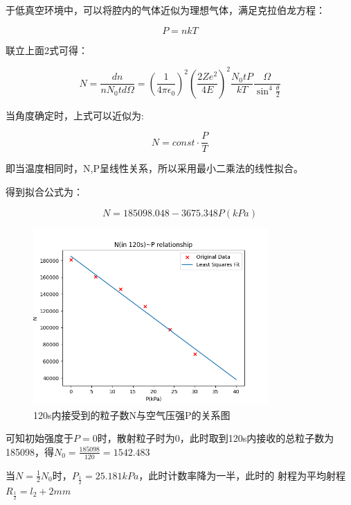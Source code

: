 \documentclass[a4paper,UTF8]{ctexart}
\begin{document}
于低真空环境中，可以将腔内的气体近似为理想气体，满足克拉伯龙方程：

\begin{equation}
    P = nkT
\end{equation}

联立上面2式可得：

\begin{equation}
    N = \frac{dn}{nN_{0}td\Omega} = (\frac{1}{4\pi \epsilon_{0}})^2 (\frac{2Ze^2}{4E})^2 \frac{N_0 t P}{k T} \frac{\Omega}{\sin^4{\frac{\theta}{2}}}
\end{equation}

当角度确定时，上式可以近似为:

\begin{equation}
    N = const \cdot \frac{P}{T}
\end{equation}

即当温度相同时，N,P呈线性关系，所以采用最小二乘法的线性拟合。

得到拟合公式为：

\begin{equation}
    N = 185098.048 -3675.348 P(kPa)
\end{equation}

\begin{figure}[H]
    \centering
    \begin{minipage}[b]{0.9\textwidth}
        \centering
        \includegraphics[width=0.8\textwidth]{./np.png}
        \caption{120s内接受到的粒子数N与空气压强P的关系图}
    \end{minipage}
\end{figure}

可知初始强度于$P=0$时，散射粒子时为0，此时取到120s内接收的总粒子数为185098，得$N_0 = \frac{185098}{120} = 1542.483$

当$N = \frac{1}{2}N_0$时，$P_{\frac{1}{2}} = 25.181 kPa$，此时计数率降为一半，此时的
射程为平均射程$R_{\frac{1}{2}} = l_2 + 2mm$
\end{document}
